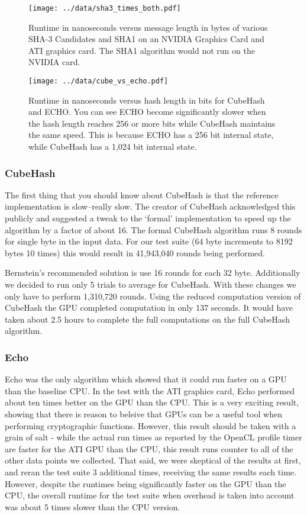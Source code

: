 \begin{figure}[p]
\texttt{[image: ../data/sha3\_times\_both.pdf]}
\caption{Runtime in nanoseconds versus message length in bytes of various SHA-3 Candidates and SHA1 on an NVIDIA Graphics Card and ATI graphics card. The SHA1 algorithm would not run on the NVIDIA card.}\label{fig:sha3_times_both}
\end{figure}

\begin{figure}[p]
\texttt{[image: ../data/cube\_vs\_echo.pdf]}
\caption{Runtime in nanoseconds versus hash length in bits for CubeHash and ECHO.  You can see ECHO become significantly slower when the hash length reaches 256 or more bits while CubeHash maintains the same speed.  This is because ECHO has a 256 bit internal state, while CubeHash has a 1,024 bit internal state.}\label{fig:cube_vs_echo}
\end{figure}

\subsubsection*{CubeHash}
The first thing that you should know about CubeHash is that the reference implementation is  slow--really slow.
The creator of CubeHash acknowledged this publicly\cite{Bernstein} and suggested a tweak to the `formal' implementation to speed up the algorithm by a factor of about 16.
The formal CubeHash algorithm runs 8 rounds for single byte in the input data. For our test suite (64 byte increments to 8192 bytes 10 times) this would result in 41,943,040 rounds being performed.

Bernstein's recommended solution is use 16 rounds for each 32 byte.
Additionally we decided to run only 5 trials to average for CubeHash.
With these changes we only have to perform 1,310,720 rounds.
Using the reduced computation version of CubeHash the GPU completed computation in only 137 seconds.
It would have taken about 2.5 hours to complete the full computations on the full CubeHash algorithm.

\subsubsection*{Echo}
Echo was the only algorithm which showed that it could run faster on a GPU than the baseline CPU.  In the test with the ATI graphics card, Echo performed about ten times better on the GPU than the CPU.
This is a very exciting result, showing that there is reason to beleive that GPUs can be a useful tool when performing cryptographic functions.
However, this result should be taken with a grain of salt - while the actual run times as reported by the OpenCL profile timer are faster for the ATI GPU than the CPU, this result runs counter to all of the other data points we collected.
That said, we were skeptical of the results at first, and reran the test suite 3 additional times, receiving the same results each time.
However, despite the runtimes being significantly faster on the GPU than the CPU, the overall runtime for the test suite when overhead is taken into account was about 5 times slower than the CPU version.

